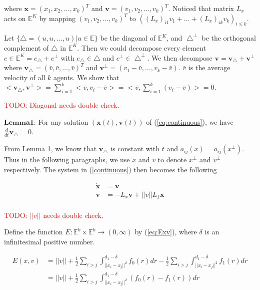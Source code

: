 \noindent
where $\mathbf{x}=(x_1, x_2, \dots, x_k)^T$ and $\mathbf{v}=(v_1, v_2, \dots, v_k)^T$. Noticed that matrix $L_x$ acts on $\mathbb{E}^K$ by mapping $(v_1, v_2, \dots, v_k)^T$ to $((L_x)_{i1}v_1+\dots+(L_x)_{ik}v_k)_{i\leq k}$.

Let $\{\bigtriangleup={(u, u, \dots, u)|u\in\mathbb{E}}\}$ be the diagonal of $\mathbb{E}^K$, and $\bigtriangleup^{\perp}$ be the orthogonal complement of $\bigtriangleup$ in $\mathbb{E}^K$. Then we could decompose every element $e\in\mathbb{E}^K=e_{\bigtriangleup}+e^{\perp}$ with $e_{\bigtriangleup}\in\bigtriangleup$ and $e^{\perp}\in\bigtriangleup^{\perp}$. We then decompose $\mathbf{v}=\mathbf{v_{\bigtriangleup}+v^{\perp}}$ where $\mathbf{v_{\bigtriangleup}}=(\bar{v}, \bar{v}, \dots, \bar{v})^T$ and $\mathbf{v^{\perp}}=(v_1-\bar{v}, \dots, v_k-\bar{v})$. $\bar{v}$ is the average velocity of all $k$ agents. We show that $<\mathbf{v_{\bigtriangleup}}, \mathbf{v^{\perp}}>=\sum_{i=1}^k<\bar{v},v_i-\bar{v}>=<\bar{v},\sum_{i=1}^k(v_i-\bar{v})>=0$.

\textcolor{red}{TODO: Diagonal needs double check.}

$\mathbf{Lemma 1}$: For any solution $(\mathbf{x}(t), \mathbf{v}(t))$ of (\ref{eq:continuous}), we have $\frac{d}{dt}\mathbf{v}_{\bigtriangleup}=0$.

From Lemma 1, we know that $\mathbf{v_{\bigtriangleup}}$ is constant with $t$ and $a_{ij}(x)=a_{ij}(x^{\perp})$. Thus in the following paragraphs, we use $x$ and $v$ to denote $x^{\perp}$ and $v^{\perp}$ respectively. The system in (\ref{continuous}) then becomes the following

\begin{equation}\label{eq:continuous_projection}
\begin{aligned}
\mathbf{\dot{x}}&=\mathbf{v}\\
\mathbf{\dot{v}}&=-L_x\mathbf{v}+||v||L_f\mathbf{x}\\
\end{aligned}
\end{equation}

\textcolor{red}{TODO: $||v||$ needs double check.}

Define the function $E: \mathbb{E}^k\times\mathbb{E}^k\to(0,\infty)$ by (\ref{eq:Exv}), where $\delta$ is an infinitesimal positive number.

\begin{equation}\label{eq:Exv}
\begin{aligned}
E(x, v)&=||v||+\frac{1}{2}\sum_{i>j}\int_{||x_i-x_j||^2}^{d_1-\delta}f_0(r)dr-\frac{1}{2}\sum_{i>j}\int_{||x_i-x_j||^2}^{d_1-\delta}f_1(r)dr\\
&=||v||+\frac{1}{2}\sum_{i>j}\int_{||x_i-x_j||^2}^{d_1-\delta}(f_0(r)-f_1(r))dr
\end{aligned}
\end{equation}

